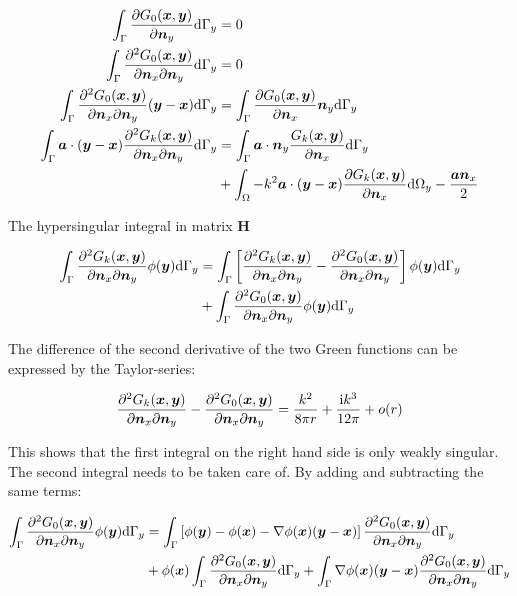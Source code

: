 \documentclass[a4paper, 10pt]{article}
\newcommand{\ti}{\mathrm{i}}
\newcommand{\td}{\mathrm{d}}
\newcommand{\sa}{\bm{\mathnormal{a}}}
\newcommand{\sx}{\bm{\mathnormal{x}}}
\newcommand{\sy}{\bm{\mathnormal{y}}}
\newcommand{\sn}{\bm{\mathnormal{n}}}
\newcommand{\bH}{\mathbf{H}}
\begin{document}
\begin{align}
	\int_\Gamma \frac{\partial G_0(\sx, \sy)}{\partial \sn_y} \td \Gamma_y & = 0 \\
	\int_\Gamma \frac{\partial^2 G_0(\sx, \sy)}{\partial \sn_x \partial \sn_y} \td \Gamma_y & = 0 \\
	\int_\Gamma \frac{\partial^2 G_0(\sx, \sy)}{\partial \sn_x \partial \sn_y}(\sy - \sx) \td \Gamma_y & = \int_\Gamma \frac{\partial G_0(\sx, \sy)}{\partial \sn_x} \sn_y \td \Gamma_y \\
	\int_\Gamma \sa \cdot (\sy - \sx) \frac{\partial^2 G_k(\sx, \sy)}{\partial \sn_x \partial \sn_y} \td \Gamma_y & = \int_\Gamma \sa \cdot \sn_y \frac{G_k(\sx, \sy)}{\partial \sn_x} \td \Gamma_y \nonumber \\
	& + \int_\Omega - k^2 \sa \cdot (\sy - \sx) \frac{\partial G_k(\sx, \sy)}{\partial \sn_x} \td \Omega_y - \frac{\sa \sn_x}{2}
\end{align}

The hypersingular integral in matrix $\bH$

\begin{align}
	\int_\Gamma \frac{\partial^2 G_k(\sx, \sy)}{\partial \sn_x \partial \sn_y} \phi(\sy) \td \Gamma_y & = 
	\int_\Gamma \left[\frac{\partial^2 G_k(\sx, \sy)}{\partial \sn_x \partial \sn_y} - \frac{\partial^2 G_0(\sx, \sy)}{\partial \sn_x \partial \sn_y}\right] \phi(\sy) \td \Gamma_y \nonumber \\
	& + \int_\Gamma \frac{\partial^2 G_0(\sx, \sy)}{\partial \sn_x \partial \sn_y} \phi(\sy) \td \Gamma_y
\end{align}

The difference of the second derivative of the two Green functions can be expressed by the Taylor-series:

\begin{equation}
	\frac{\partial^2 G_k(\sx, \sy)}{\partial \sn_x \partial \sn_y} - \frac{\partial^2 G_0(\sx, \sy)}{\partial \sn_x \partial \sn_y} = 
	\frac{k^2}{8 \pi r} + \frac{\ti k^3}{12 \pi} + o(r)
\end{equation}

This shows that the first integral on the right hand side is only weakly singular.
The second integral needs to be taken care of. By adding and subtracting the same terms:

\begin{align}
	\int_\Gamma \frac{\partial^2 G_0(\sx, \sy)}{\partial \sn_x \partial \sn_y} \phi(\sy) \td \Gamma_y & =
	\int_\Gamma \left[\phi(\sy) - \phi(\sx) - \nabla \phi(\sx) (\sy - \sx) \right] \frac{\partial^2 G_0(\sx, \sy)}{\partial \sn_x \partial \sn_y} \td \Gamma_y \nonumber \\
	& + \phi(\sx) \int_\Gamma \frac{\partial^2 G_0(\sx, \sy)}{\partial \sn_x \partial \sn_y} \td \Gamma_y +
	\int_\Gamma \nabla \phi(\sx) (\sy - \sx) \frac{\partial^2 G_0(\sx, \sy)}{\partial \sn_x \partial \sn_y} \td \Gamma_y
\end{align}
\end{document}
